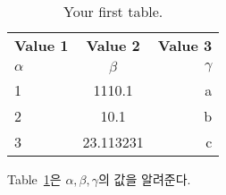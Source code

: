 \documentclass[12pt]{article}
\begin{document}
	
	
	\begin{table}[h!]
		\begin{center}
			\caption{Your first table.}
			\label{tab:Values}
			\begin{tabular}{ l | c | r }
				\hline
				\textbf{Value 1} & \textbf{Value 2} & \textbf{Value 3} \\
				$\alpha$ & $\beta$ & $\gamma$ \\
				\hline 
				1 & 1110.1 & a \\ 
				2 & 10.1 & b \\
				3 & 23.113231 & c \\ 
				\hline
			\end{tabular}
		\end{center}
	\end{table}
	
	Table~\ref{tab:Values}은 $\alpha, \beta, \gamma$의 값을 알려준다.
	
\end{document}
